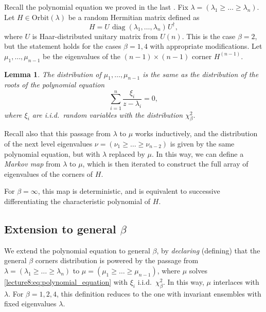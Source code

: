 \documentclass[letterpaper,11pt,oneside,reqno]{book}
\numberwithin{equation}{chapter}  %
\newcommand{\ssp}{\hspace{1pt}}
\newtheorem{lemma}[proposition]{Lemma}
\theoremstyle{definition}
\begin{document}
Recall the polynomial equation we proved in the last .
Fix $\lambda=(\lambda_1\ge \ldots \ge \lambda_n )$.
Let $H\in \mathrm{Orbit}(\lambda)$ be a random Hermitian matrix
defined as
\begin{equation*}
	H=U\ssp \mathrm{\operatorname{diag}}(\lambda_1,\ldots,\lambda_n)\ssp U^\dagger,
\end{equation*}
where $U$ is Haar-distributed unitary matrix from $U(n)$.
This is the case $\beta=2$,
but the statement holds for the cases $\beta=1,4$ with appropriate modifications.
Let $\mu_1,\ldots,\mu_{n-1}$ be the eigenvalues of the $(n-1)\times(n-1)$ corner $H^{(n-1)}$.
\begin{lemma}
	\label{lecture8:lemma:corner_step}
	The distribution of $\mu_1,\ldots,\mu_{n-1}$ is the same as the distribution of
	the roots of the polynomial equation
	\begin{equation}
		\label{lecture8:eq:polynomial_equation}
		\sum_{i=1}^n \frac{\xi_i}{z-\lambda_i}=0,
	\end{equation}
	where $\xi_i$ are i.i.d.\ random variables with the distribution $\chi^2_\beta$.
\end{lemma}
Recall also that this passage from $\lambda$ to $\mu$ works inductively, and
the distribution of the next level eigenvalues $\nu=(\nu_1\ge \ldots \ge \nu_{n-2})$
is given by the same polynomial equation, but with $\lambda$ replaced by $\mu$.
In this way, we can define a \emph{Markov map} from $\lambda$ to $\mu$, which is then iterated
to construct the full array of eigenvalues of the corners of $H$.

For $\beta=\infty$, this map is deterministic, and is equivalent to successive differentiating the
characteristic polynomial of $H$.

\subsection{Extension to general \texorpdfstring{\(\beta\)}{beta}}

We extend the polynomial equation to general $\beta$,
by \emph{declaring} (defining) that the general $\beta$ corners distribution
is powered by the passage from $\lambda=(\lambda_1\ge \ldots \ge \lambda_n)$ to $\mu=(\mu_1\ge \ldots \ge \mu_{n-1})$,
where $\mu$ solves \eqref{lecture8:eq:polynomial_equation} with $\xi_i$ i.i.d.\ $\chi^2_\beta$.
In this way, $\mu$ interlaces with $\lambda$.
For $\beta=1,2,4$, this definition reduces to the one with invariant ensembles
with fixed eigenvalues $\lambda$.
\end{document}
